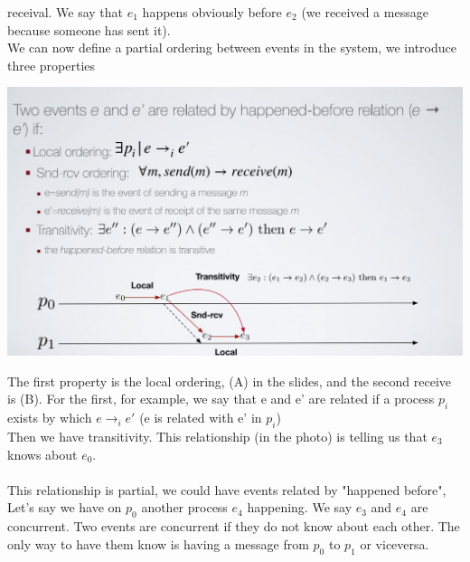 \documentclass[11pt, a4paper]{article}
\begin{document}
receival. We say that $e_1$ happens obviously before $e_2$ (we received a message because
someone has sent it).\\
We can now define a partial ordering between events in the system, we introduce
three properties
\begin{center}
    \includegraphics[scale=0.5]{img/logical time/properties.png}
\end{center}
The first property is the local ordering, (A) in the slides, and the second receive is
(B).
For the first, for example, we say that e and e' are related if a process $p_i$ exists by which $e \rightarrow_i e'$ (e is related with e' in $p_i$)\\
Then we have transitivity. This relationship (in the photo) is telling us that $e_3$
knows about $e_0$.\\\\
This relationship is partial, we could have events related by "happened before",\\
Let's say we have on $p_0$ another process $e_4$ happening. We say $e_3$ and $e_4$ are
concurrent. Two events are concurrent if they do not know about each other. The
only way to have them know is having a message from $p_0$ to $p_1$ or viceversa.
\end{document}
